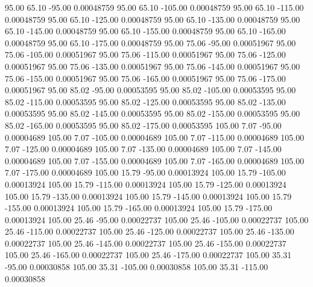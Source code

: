      95.00     65.10    -95.00     0.00048759
     95.00     65.10   -105.00     0.00048759
     95.00     65.10   -115.00     0.00048759
     95.00     65.10   -125.00     0.00048759
     95.00     65.10   -135.00     0.00048759
     95.00     65.10   -145.00     0.00048759
     95.00     65.10   -155.00     0.00048759
     95.00     65.10   -165.00     0.00048759
     95.00     65.10   -175.00     0.00048759
     95.00     75.06    -95.00     0.00051967
     95.00     75.06   -105.00     0.00051967
     95.00     75.06   -115.00     0.00051967
     95.00     75.06   -125.00     0.00051967
     95.00     75.06   -135.00     0.00051967
     95.00     75.06   -145.00     0.00051967
     95.00     75.06   -155.00     0.00051967
     95.00     75.06   -165.00     0.00051967
     95.00     75.06   -175.00     0.00051967
     95.00     85.02    -95.00     0.00053595
     95.00     85.02   -105.00     0.00053595
     95.00     85.02   -115.00     0.00053595
     95.00     85.02   -125.00     0.00053595
     95.00     85.02   -135.00     0.00053595
     95.00     85.02   -145.00     0.00053595
     95.00     85.02   -155.00     0.00053595
     95.00     85.02   -165.00     0.00053595
     95.00     85.02   -175.00     0.00053595
    105.00      7.07    -95.00     0.00004689
    105.00      7.07   -105.00     0.00004689
    105.00      7.07   -115.00     0.00004689
    105.00      7.07   -125.00     0.00004689
    105.00      7.07   -135.00     0.00004689
    105.00      7.07   -145.00     0.00004689
    105.00      7.07   -155.00     0.00004689
    105.00      7.07   -165.00     0.00004689
    105.00      7.07   -175.00     0.00004689
    105.00     15.79    -95.00     0.00013924
    105.00     15.79   -105.00     0.00013924
    105.00     15.79   -115.00     0.00013924
    105.00     15.79   -125.00     0.00013924
    105.00     15.79   -135.00     0.00013924
    105.00     15.79   -145.00     0.00013924
    105.00     15.79   -155.00     0.00013924
    105.00     15.79   -165.00     0.00013924
    105.00     15.79   -175.00     0.00013924
    105.00     25.46    -95.00     0.00022737
    105.00     25.46   -105.00     0.00022737
    105.00     25.46   -115.00     0.00022737
    105.00     25.46   -125.00     0.00022737
    105.00     25.46   -135.00     0.00022737
    105.00     25.46   -145.00     0.00022737
    105.00     25.46   -155.00     0.00022737
    105.00     25.46   -165.00     0.00022737
    105.00     25.46   -175.00     0.00022737
    105.00     35.31    -95.00     0.00030858
    105.00     35.31   -105.00     0.00030858
    105.00     35.31   -115.00     0.00030858
